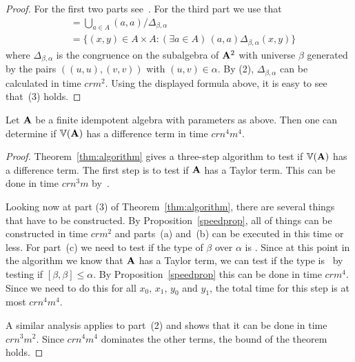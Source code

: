 \begin{proof}
For the first two parts see~\cite[Proposition~6.1]{Freese:2009}. 
For the third part we use that
\begin{align*}
[\alpha, \beta]
  &= \bigcup_{a\in A} (a,a)/\Delta_{\beta,\alpha}  \\
  &= \bigl\{(x,y) \in A\times A : (\exists a \in A) \, 
  (a,a) \mathrel{\Delta_{\beta,\alpha}} (x,y)\bigr\}
\end{align*}
where $\Delta_{\beta,\alpha}$ is the congruence on the
subalgebra of $\mathbf{A}^2$ with universe $\beta$ 
generated by the pairs $((u,u), (v,v))$ with $(u,v) \in \alpha$.
By (2), $\Delta_{\beta,\alpha}$ can be calculated in time
$crm^2$. Using the displayed formula above, it is easy to see
that~(3) holds.
\end{proof}

\begin{theorem}\label{thm:time}
Let $\mathbf{A}$ be a finite idempotent algebra with parameters as
above. 
Then one can determine if $\operatorname{\mathbb{V}}(\mathbf{A})$ has a difference
term in time $crn^4m^4$.
\end{theorem}

\begin{proof}
Theorem~\ref{thm:algorithm} gives a three-step 
algorithm to test
if $\operatorname{\mathbb{V}} (\mathbf{A})$ has a difference term.
The first step is to test if $\mathbf{A}$ has a Taylor
term. This can be done in time $crn^3m$ 
by~\cite[Theorem~6.3]{Freese:2009}.

Looking now at part (3) of Theorem~\ref{thm:algorithm},
there are several things that have to be constructed.
By Proposition~\ref{speedprop}, all
of things can be constructed in time $crm^2$ and 
parts~(a) and~(b) can be executed in this time or less.
For part~(c) we need to test if the type of $\beta$
over $\alpha$ is \atyp. Since at this point in the
algorithm we know that $\mathbf{A}$ has a Taylor term,
we can test if the type is \atyp\ by testing if
$[\beta,\beta] \le \alpha$. By Proposition~\ref{speedprop}
this can be done in time $crm^4$. Since we need to do
this for all $x_0$, $x_1$, $y_0$ and $y_1$, the total
time for this step is at most $crn^4m^4$. 

A similar analysis applies to part~(2) and shows that it
can be done in time $crn^3m^2$. Since $crn^4m^4$ dominates
the other terms, the bound of the theorem holds.
\end{proof}



